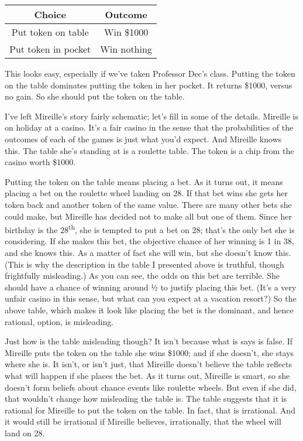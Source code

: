 \documentclass[
  11pt,
]{book}
\begin{document}
\begin{longtable}[]{@{}cc@{}}
\toprule()
\textbf{Choice} & \textbf{Outcome} \\
\midrule()
\endhead
Put token on table & Win \$1000 \\
Put token in pocket & Win nothing \\
\bottomrule()
\end{longtable}

This looks easy, especially if we've taken Professor Dec's class. Putting the token on the table dominates putting the token in her pocket. It returns \$1000, versus no gain. So she should put the token on the table.

I've left Mireille's story fairly schematic; let's fill in some of the details. Mireille is on holiday at a casino. It's a fair casino in the sense that the probabilities of the outcomes of each of the games is just what you'd expect. And Mireille knows this. The table she's standing at is a roulette table. The token is a chip from the casino worth \$1000.

Putting the token on the table means placing a bet. As it turns out, it means placing a bet on the roulette wheel landing on 28. If that bet wins she gets her token back and another token of the same value. There are many other bets she could make, but Mireille has decided not to make all but one of them. Since her birthday is the 28\textsuperscript{th}, she is tempted to put a bet on 28; that's the only bet she is considering. If she makes this bet, the objective chance of her winning is 1 in 38, and she knows this. As a matter of fact she will win, but she doesn't know this. (This is why the description in the table I presented above is truthful, though frightfully misleading.) As you can see, the odds on this bet are terrible. She should have a chance of winning around ½ to justify placing this bet. (It's a very unfair casino in this sense, but what can you expect at a vacation resort?) So the above table, which makes it look like placing the bet is the dominant, and hence rational, option, is misleading.

Just how is the table misleading though? It isn't because what is says is false. If Mireille puts the token on the table she wins \$1000; and if she doesn't, she stays where she is. It isn't, or isn't just, that Mireille doesn't believe the table reflects what will happen if she places the bet. As it turns out, Mireille is smart, so she doesn't form beliefs about chance events like roulette wheels. But even if she did, that wouldn't change how misleading the table is. The table suggests that it is rational for Mireille to put the token on the table. In fact, that is irrational. And it would still be irrational if Mireille believes, irrationally, that the wheel will land on 28.
\end{document}
